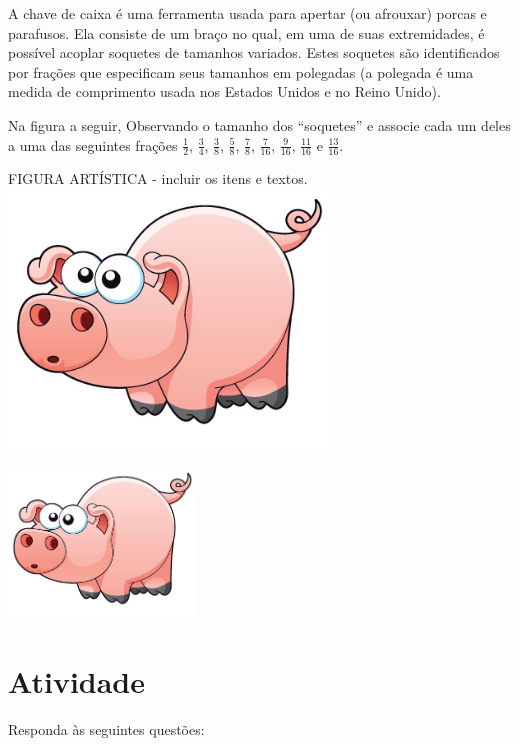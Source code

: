 \documentclass[a4,12pt]{book}
\begin{document}
A chave de caixa é uma ferramenta usada para apertar (ou afrouxar) porcas e parafusos. Ela consiste 
de um braço no qual, em uma de suas extremidades, é possível acoplar soquetes de tamanhos variados.
Estes soquetes são identificados por frações que especificam seus tamanhos em polegadas (a polegada é uma medida de comprimento usada nos Estados Unidos e no Reino Unido).

Na figura a seguir, Observando o tamanho dos ``soquetes'' e associe cada um deles a uma das seguintes frações $\frac{1}{2}$, $\frac{3}{4}$, $\frac{3}{8}$, $\frac{5}{8}$, $\frac{7}{8}$, $\frac{7}{16}$, $\frac{9}{16}$, $\frac{11}{16}$ e $\frac{13}{16}$.
\begin{imagem*}[breakable]{}{}   FIGURA ARTÍSTICA - incluir os itens e textos.  
    \includegraphics[width=240pt, keepaspectratio]{pig}  
\end{imagem*}




\includegraphics[width=\textwidth,height=4cm, keepaspectratio]{pig}
\section{Atividade}







Responda às seguintes questões: 
\end{document}
